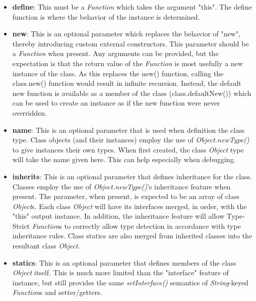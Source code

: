 \documentclass[12pt,letterpaper]{report}
\begin{document}
\begin{itemize}
  \item \textbf{define}: This must be a \textit{Function} which takes the argument "this".
  The define function is where the behavior of the instance is determined.
  
  \item \textbf{new}: This is an optional parameter which replaces the behavior of "new",
  thereby introducing custom external constructors. This parameter should be a \textit{Function} when 
  present. Any arguments can be provided, but the expectation is that the return value of 
  the \textit{Function} is most usefully a new instance of the class. As this replaces the new() function,
  calling the class.new() function would result in infinite recursion. Instead, the default 
  new function is available as a member of the class (class.defaultNew()) which can be 
  used to create an instance as if the new function were never overridden.
  
  \item \textbf{name}: This is an optional parameter that is used when definition the 
  class type. Class objects (and their instances) employ the use of \textit{Object.newType()}
  to give instances their own types. When first created, the class \textit{Object} type will 
  take the name given here. This can help especially when debugging.
  
  \item \textbf{inherits}: This is an optional parameter that defines inheritance for the 
  class. Classes employ the use of \textit{Object.newType()}'s inheritance feature when present.
  The parameter, when present, is expected to be an array of class \textit{Object}s. Each class \textit{Object}
  will have its interfaces merged, in order, with the "this" output instance. In addition, the inheritance 
  feature will allow Type-Strict \textit{Function}s to correctly allow type detection in 
  accordance with type inheritance rules. Class statics are also merged from inherited 
  classes into the resultant class \textit{Object}.
  
  \item \textbf{statics}: This is an optional parameter that defines members of the 
  class \textit{Object} itself. This is much more limited than the "interface" feature of 
  instance, but still provides the same \textit{setInterface()} semantics of \textit{String}-keyed
  \textit{Function}s and setter/getters.
  
\end{itemize}
\end{document}
